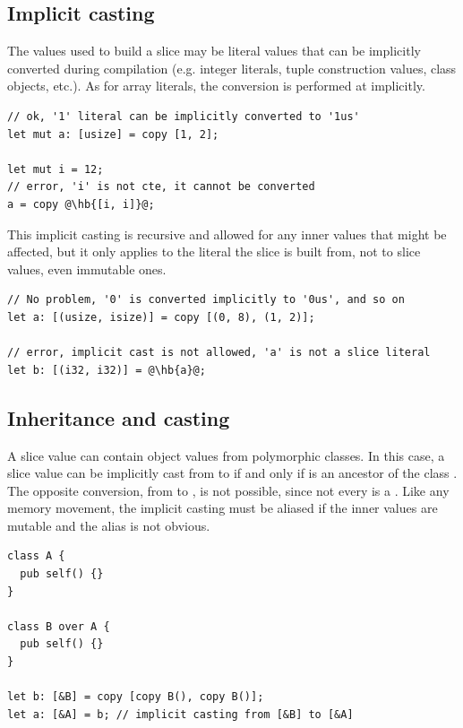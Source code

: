 \subsection{Implicit casting}

The values used to build a slice may be literal values that can be implicitly
converted during compilation (e.g. integer literals, tuple construction values,
class objects, etc.). As for array literals, the conversion is performed at
 implicitly.

\begin{lstlisting}[style=coloredverbatimError, escapechar=@]
// ok, '1' literal can be implicitly converted to '1us'
let mut a: [usize] = copy [1, 2];

let mut i = 12;
// error, 'i' is not cte, it cannot be converted
a = copy @\hb{[i, i]}@;
\end{lstlisting}

This implicit casting is recursive and allowed for any inner values that might
be affected, but it only applies to the literal the slice is built from, not to
slice values, even immutable ones.

\begin{lstlisting}[style=coloredverbatimError, escapechar=@]
// No problem, '0' is converted implicitly to '0us', and so on
let a: [(usize, isize)] = copy [(0, 8), (1, 2)];

// error, implicit cast is not allowed, 'a' is not a slice literal
let b: [(i32, i32)] = @\hb{a}@;
\end{lstlisting}

\subsection{Inheritance and casting}

A slice value can contain object values from polymorphic classes. In this case,
a slice value can be implicitly cast from \token{[B]} to \token{[A]} if and only
if  is an ancestor of the class . The opposite conversion,
from \token{[A]} to \token{[B]}, is not possible, since not every  is a
. Like any memory movement, the implicit casting must be aliased if the
inner values are mutable and the alias is not obvious.

\begin{lstlisting}[style=coloredverbatim]
class A {
  pub self() {}
}

class B over A {
  pub self() {}
}

let b: [&B] = copy [copy B(), copy B()];
let a: [&A] = b; // implicit casting from [&B] to [&A]
\end{lstlisting}

\vfill%
\pagebreak
